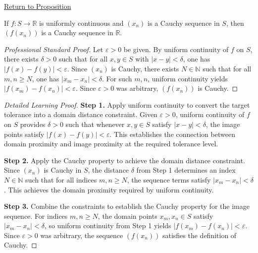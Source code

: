 \newpage
{}
\label{prf:uniform-continuity-cauchy}

\begin{remark*}[Return]
\hyperref[prop:uniform-continuity-cauchy]{Return to Proposition}
\end{remark*}

\begin{proposition*}
If $f \colon S \to \mathbb{R}$ is uniformly continuous and $(x_{n})$ is a Cauchy sequence in $S$, then $(f(x_{n}))$ is a Cauchy sequence in $\mathbb{R}$.
\end{proposition*}

\begin{proof}[Professional Standard Proof]
\LRAProofBodyStart
Let $\varepsilon > 0$ be given. By uniform continuity of $f$ on $S$, there exists $\delta > 0$ such that for all $x, y \in S$ with $|x - y| < \delta$, one has $|f(x) - f(y)| < \varepsilon$. Since $(x_{n})$ is Cauchy, there exists $N \in \mathbb{N}$ such that for all $m, n \geq N$, one has $|x_{m} - x_{n}| < \delta$. For such $m, n$, uniform continuity yields $|f(x_{m}) - f(x_{n})| < \varepsilon$. Since $\varepsilon > 0$ was arbitrary, $(f(x_{n}))$ is Cauchy.
\end{proof}

\begin{proof}[Detailed Learning Proof]
\LRAProofBodyStart

\textbf{Step 1.} Apply uniform continuity to convert the target tolerance into a domain distance constraint. Given $\varepsilon > 0$, uniform continuity of $f$ on $S$ provides $\delta > 0$ such that whenever $x, y \in S$ satisfy $|x - y| < \delta$, the image points satisfy $|f(x) - f(y)| < \varepsilon$. This establishes the connection between domain proximity and image proximity at the required tolerance level.

\textbf{Step 2.} Apply the Cauchy property to achieve the domain distance constraint. Since $(x_{n})$ is Cauchy in $S$, the distance $\delta$ from Step 1 determines an index $N \in \mathbb{N}$ such that for all indices $m, n \geq N$, the sequence terms satisfy $|x_{m} - x_{n}| < \delta$. This achieves the domain proximity required by uniform continuity.

\textbf{Step 3.} Combine the constraints to establish the Cauchy property for the image sequence. For indices $m, n \geq N$, the domain points $x_{m}, x_{n} \in S$ satisfy $|x_{m} - x_{n}| < \delta$, so uniform continuity from Step 1 yields $|f(x_{m}) - f(x_{n})| < \varepsilon$. Since $\varepsilon > 0$ was arbitrary, the sequence $(f(x_{n}))$ satisfies the definition of Cauchy.
\end{proof}

